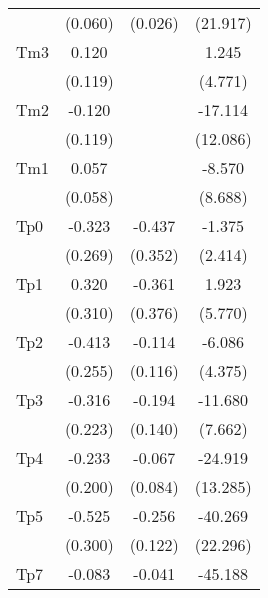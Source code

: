 {\begin{tabular}{l*{3}{c}}
                    &     (0.060)         &     (0.026)         &    (21.917)         \\
[1em]
Tm3                 &       0.120         &                     &       1.245         \\
                    &     (0.119)         &                     &     (4.771)         \\
[1em]
Tm2                 &      -0.120         &                     &     -17.114         \\
                    &     (0.119)         &                     &    (12.086)         \\
[1em]
Tm1                 &       0.057         &                     &      -8.570         \\
                    &     (0.058)         &                     &     (8.688)         \\
[1em]
Tp0                 &      -0.323         &      -0.437         &      -1.375         \\
                    &     (0.269)         &     (0.352)         &     (2.414)         \\
[1em]
Tp1                 &       0.320         &      -0.361         &       1.923         \\
                    &     (0.310)         &     (0.376)         &     (5.770)         \\
[1em]
Tp2                 &      -0.413         &      -0.114         &      -6.086         \\
                    &     (0.255)         &     (0.116)         &     (4.375)         \\
[1em]
Tp3                 &      -0.316         &      -0.194         &     -11.680         \\
                    &     (0.223)         &     (0.140)         &     (7.662)         \\
[1em]
Tp4                 &      -0.233         &      -0.067         &     -24.919\sym{*}  \\
                    &     (0.200)         &     (0.084)         &    (13.285)         \\
[1em]
Tp5                 &      -0.525\sym{*}  &      -0.256\sym{**} &     -40.269\sym{*}  \\
                    &     (0.300)         &     (0.122)         &    (22.296)         \\
[1em]
Tp7                 &      -0.083         &      -0.041         &     -45.188         \\

\end{tabular}}
